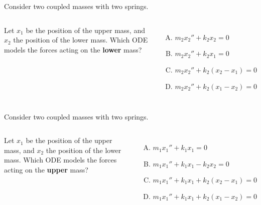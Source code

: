 \begin{applicationActivities}

\begin{activity}{10}
Consider two coupled masses with two springs. 

\vfill

\begin{columns}
\springdoublemass
{}
Let \(x_1\) be the position of the upper mass, and \(x_2\) the position of the lower mass.  Which ODE models the forces acting on the \textbf{lower} mass?
\vfill
\begin{enumerate} [(A)]
\item \(m_2x_2'' +k_2 x_2 = 0 \)
\item \(m_2x_2'' +k_2 x_1 = 0 \)
\item \(m_2x_2'' +k_2 (x_2-x_1) = 0 \)
\item \(m_2x_2'' +k_2 (x_1-x_2) = 0 \)
\end{enumerate}
\end{columns}
\end{activity}

\begin{activity}{5}
Consider two coupled masses with two springs. 

\vfill

\begin{columns}
\springdoublemass
{}
Let \(x_1\) be the position of the upper mass, and \(x_2\) the position of the lower mass.  Which ODE models the forces acting on the \textbf{upper} mass?
\vfill
\begin{enumerate} [(A)]
\item \(m_1x_1'' +k_1 x_1 = 0 \)
\item \(m_1x_1'' +k_1 x_1 -k_2x_2= 0 \)
\item \(m_1x_1'' +k_1 x_1 + k_2(x_2-x_1) = 0 \)
\item \(m_1x_1'' +k_1 x_1 + k_2(x_1-x_2) = 0 \)
\end{enumerate}
\end{columns}
\end{activity}


\end{applicationActivities}
